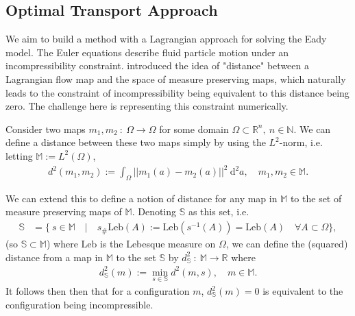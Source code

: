 \documentclass[11pt, oneside]{article}   	%
\newcommand{\R}{\mathbb{R}}
\newcommand{\dsmsq}{d^{2}_{\mathbb{S}}(m)}
\newcommand{\M}{\mathbb{M}}
\newcommand{\N}{\mathbb{N}}
\newcommand{\Sb}{\mathbb{S}}
\newcommand{\Leb}{\mathrm{Leb}}
\begin{document}
\subsection{Optimal Transport Approach}

We aim to build a method with a Lagrangian approach for solving the Eady model. The Euler equations describe fluid particle motion under an incompressibility constraint. \cite{brenier1989least} introduced the idea of "distance" between a Lagrangian flow map and the space of measure preserving maps, which naturally leads to the constraint of incompressibility being equivalent to this distance being zero. The challenge here is representing this constraint numerically.

Consider two maps \(m_1, m_2 \: : \: \Omega \to \Omega\) for some domain \(\Omega \subset \R^n, \: n \in \N\). We can define a distance between these two maps simply by using the \(L^2\)-norm, i.e. letting \(\M := L^2(\Omega)\), 
\begin{align}
d^2(m_1, m_2) := \int_\Omega || m_1(a) - m_2(a) ||^2 \: \mathrm{d}^2 a, \quad m_1, m_2 \in \M.
\end{align}

We can extend this to define a notion of distance for any map in \(\M\) to the set of measure preserving maps of \(\M\). Denoting \(\Sb\) as this set, i.e. 
\begin{align}
\Sb &= \Big\{ \: s \in \M \quad | \quad s_{\#}\Leb(A) := \Leb(s^{-1}(A)) = \Leb(A) \quad \forall A \subset \Omega \Big\},
\end{align}
(so \(\Sb \subset \M\)) where \(\Leb\) is the Lebesque measure on \(\Omega\), we can define the (squared) distance from a map in \(\M\) to the set \(\Sb\) by \(d^2_\Sb \: : \: \M \to \R\) where
\begin{align}
\dsmsq := \min_{s \in \mathbb{S}} d^2(m, s), \quad m \in \M.
\end{align}
It follows then then that for a configuration \(m\), \(\dsmsq = 0\) is equivalent to the configuration being incompressible.
\end{document}
